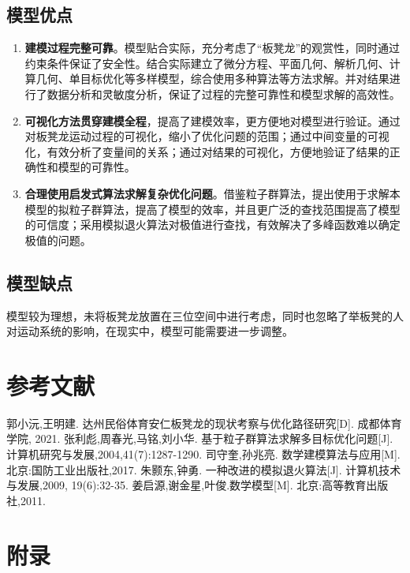\documentclass[a4paper]{article}
\begin{document}
	\subsection{模型优点}
	\begin{enumerate}
		\item \textbf{建模过程完整可靠}。模型贴合实际，充分考虑了“板凳龙”的观赏性，同时通过约束条件保证了安全性。结合实际建立了微分方程、平面几何、解析几何、计算几何、单目标优化等多样模型，综合使用多种算法等方法求解。并对结果进行了数据分析和灵敏度分析，保证了过程的完整可靠性和模型求解的高效性。
		\item \textbf{可视化方法贯穿建模全程}，提高了建模效率，更方便地对模型进行验证。通过对板凳龙运动过程的可视化，缩小了优化问题的范围；通过中间变量的可视化，有效分析了变量间的关系；通过对结果的可视化，方便地验证了结果的正确性和模型的可靠性。
		\item \textbf{合理使用启发式算法求解复杂优化问题}。借鉴粒子群算法，提出使用于求解本模型的拟粒子群算法，提高了模型的效率，并且更广泛的查找范围提高了模型的可信度；采用模拟退火算法对极值进行查找，有效解决了多峰函数难以确定极值的问题。
	\end{enumerate}

	\subsection{模型缺点}
		模型较为理想，未将板凳龙放置在三位空间中进行考虑，同时也忽略了举板凳的人对运动系统的影响，在现实中，模型可能需要进一步调整。

	
	\section{参考文献}
	\vspace{-2em} %
	\begin{thebibliography}{9}
		郭小沅,王明建. 达州民俗体育安仁板凳龙的现状考察与优化路径研究[D]. 成都体育学院, 2021.
		 张利彪,周春光,马铭,刘小华. 基于粒子群算法求解多目标优化问题[J]. 计算机研究与发展,2004,41(7):1287-1290.
		 司守奎,孙兆亮. 数学建模算法与应用[M]. 北京:国防工业出版社,2017.
		 朱颢东,钟勇. 一种改进的模拟退火算法[J]. 计算机技术与发展,2009, 19(6):32-35.
		 姜启源,谢金星,叶俊.数学模型[M]. 北京:高等教育出版社,2011.
	\end{thebibliography}
	
	\newpage
	\section*{附录}
	
\end{document}
